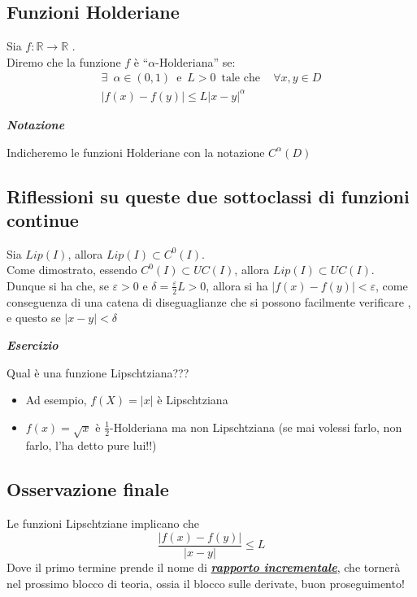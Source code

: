 \documentclass{article}
\theoremstyle{definition}
\newcommand{\virgolette}[1]{``#1''}
\begin{document}
\subsection{Funzioni Holderiane}
Sia $f: \mathbb{R} \to \mathbb{R}$
.\\
Diremo che la funzione $f$ è \virgolette{$\alpha$-Holderiana} se:
\\
\begin{align*}
    \exists \,\,\, \alpha \in (0,1) \,\,\, \mbox{e} \,\,\, L>0 \,\,\, \mbox{tale che}\,\,\,\,\,\,\, \forall x,y \in D \\
    |f(x)-f(y)| \leqslant L{|x-y|}^\alpha
\end{align*}
\begin{center}
    \textbf{\textit{Notazione}}
\end{center}
Indicheremo le funzioni Holderiane con la notazione $C^\alpha(D)$
\subsection{Riflessioni su queste due sottoclassi di funzioni continue}
Sia $Lip(I)$, allora $Lip(I) \subset C^0(I)$.
\\
Come dimostrato, essendo $C^0(I) \subset UC(I)$, allora $Lip(I) \subset UC(I)$.
\\
Dunque si ha che, se $\varepsilon>0$ e $\delta=\frac{\varepsilon}{2}L>0$, allora si ha $|f(x)-f(y)|<\varepsilon$, come conseguenza di una catena di diseguaglianze che si possono facilmente verificare , e questo se $|x-y|<\delta$

\begin{center}
    \textbf{\textit{Esercizio}}
\end{center}
Qual è una funzione Lipschtziana???
\\
\begin{itemize}
    \item Ad esempio, $f(X)=|x|$ è Lipschtziana
    \item $f(x)=\sqrt{x}$ è $\frac{1}{2}$-Holderiana ma non Lipschtziana (se mai volessi farlo, non farlo, l'ha detto pure lui!!)
\end{itemize}
\subsection{Osservazione finale}
Le funzioni Lipschtziane implicano che
\begin{equation*}
    \frac{|f(x)-f(y)|}{|x-y|}\leqslant L
\end{equation*}
Dove il primo termine prende il nome di \underline{\textbf{\textit{rapporto incrementale}}}, che tornerà nel prossimo blocco di teoria, ossia il blocco sulle derivate, buon proseguimento!
\newpage
\end{document}
